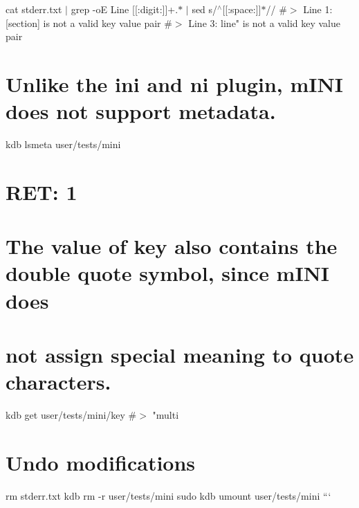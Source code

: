 cat stderr.\+txt $\vert$ grep -\/oE \textquotesingle{}Line \mbox{[}\mbox{[}\+:digit\+:\mbox{]}\mbox{]}+.$\ast$\textquotesingle{} $\vert$ sed \textquotesingle{}s/$^\wedge$\mbox{[}\mbox{[}\+:space\+:\mbox{]}\mbox{]}$\ast$//\textquotesingle{} \#$>$ Line 1\+: \textquotesingle{}\mbox{[}section\mbox{]}\textquotesingle{} is not a valid key value pair \#$>$ Line 3\+: \textquotesingle{}line"\textquotesingle{} is not a valid key value pair

\section*{Unlike the {\ttfamily ini} and {\ttfamily ni} plugin, m\+I\+NI does not support metadata.}

kdb lsmeta user/tests/mini \section*{R\+ET\+: 1}

\section*{The value of {\ttfamily key} also contains the double quote symbol, since m\+I\+NI does}

\section*{not assign special meaning to quote characters.}

kdb get user/tests/mini/key \#$>$ "multi

\section*{Undo modifications}

rm stderr.\+txt kdb rm -\/r user/tests/mini sudo kdb umount user/tests/mini ``` 